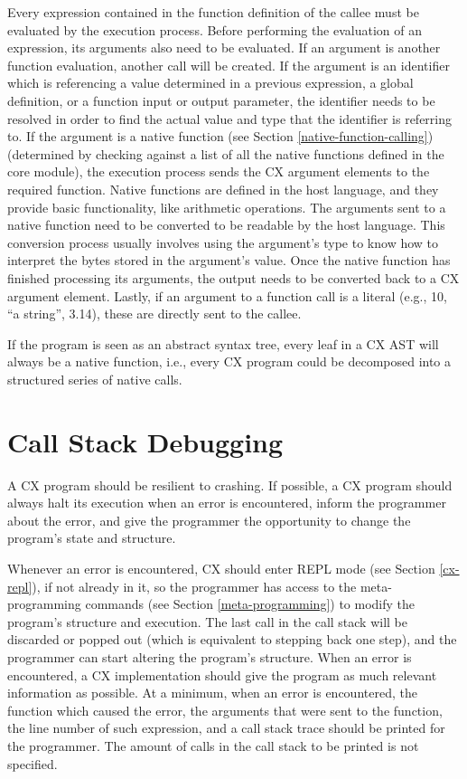 Every expression contained in the function definition of the callee
must be evaluated by the execution process. Before performing the
evaluation of an expression, its arguments also need to be
evaluated. If an argument is another function evaluation, another call
will be created. If the argument is an identifier which is referencing
a value determined in a previous expression, a global definition, or a
function input or output parameter, the identifier needs to be
resolved in order to find the actual value and type that the
identifier is referring to. If the argument is a native function (see
Section \ref{native-function-calling}) (determined by checking against
a list of all the native functions defined in the core module), the
execution process sends the CX argument elements to the required
function. Native functions are defined in the host language, and
they provide basic functionality, like arithmetic operations. The
arguments sent to a native function need to be converted to be readable
by the host language. This conversion process usually involves using
the argument's type to know how to interpret the bytes stored in the
argument's value. Once the native function has finished processing its
arguments, the output needs to be converted back to a CX argument
element. Lastly, if an argument to a function call is a literal (e.g.,
10, ``a string'', 3.14), these are directly sent to the callee.

If the program is seen as an abstract syntax tree, every leaf in a CX
AST will always be a native function, i.e., every CX program could be
decomposed into a structured series of native calls.

\section{Call Stack Debugging}
\label{call-stack-debugging}

A CX program should be resilient to crashing. If possible, a CX
program should always halt its execution when an error is encountered,
inform the programmer about the error, and give the programmer the
opportunity to change the program's state and structure.

Whenever an error is encountered, CX should enter REPL mode (see
Section \ref{cx-repl}), if not already in it, so the programmer has
access to the meta-programming commands (see Section
\ref{meta-programming}) to modify the program's structure and
execution. The last call in the call stack will be discarded or popped
out (which is equivalent to stepping back one step), and the
programmer can start altering the program's structure. When an error
is encountered, a CX implementation should give the program as much
relevant information as possible. At a minimum, when an error is
encountered, the function which caused the error, the arguments that
were sent to the function, the line number of such expression, and a
call stack trace should be printed for the programmer. The amount of
calls in the call stack to be printed is not specified.


